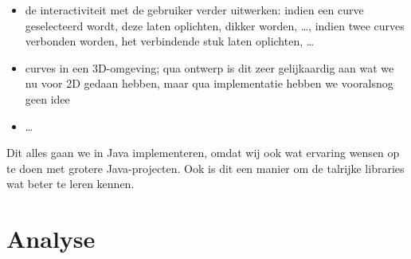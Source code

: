 \documentclass[a4paper,11pt,oneside, titlepage]{article}
\begin{document}
\begin{itemize}
\begin{itemize}
\begin{itemize}
\item Soundmixer: de curve, of curves voor meerdere instrumenten bijvoorbeeld, stelt dan een tijdslijn voor. De X-as wordt dan van links naar rechts doorlopen, en hoe hoger de corresponderende Y-waarde op dat moment, hoe hoger de toon die men te horen krijgt.
\item Transformer: we geven een afbeelding en laten die weergeven. De gebruiker plaatst een aantal punten in het vlak, en alnaargelang hij ze nadien versleept, vervormt de afbeelding. Ons lijkt dit het moeilijkst van al te implementeren, maar niet z\'o onoverkomelijk. 
\item Curving: we geven een afbeelding in, en krijgen een curve-variant van die afbeelding terug. Elke lijn op de afbeelding wordt dus omgezet in \'e\'en of andere curve en weergegeven.
\item \ldots
\end{itemize}
\item de interactiviteit met de gebruiker verder uitwerken: indien een curve geselecteerd wordt, deze laten oplichten, dikker worden, \ldots, indien twee curves verbonden worden, het verbindende stuk laten oplichten, \ldots
\item curves in een 3D-omgeving; qua ontwerp is dit zeer gelijkaardig aan wat we nu voor 2D gedaan hebben, maar qua implementatie hebben we vooralsnog geen idee
\item \ldots
\end{itemize}
\end{itemize}
Dit alles gaan we in Java implementeren, omdat wij ook wat ervaring wensen op te doen met grotere Java-projecten. Ook is dit een manier om de talrijke libraries wat beter te leren kennen.
\section{Analyse}
\end{document}
